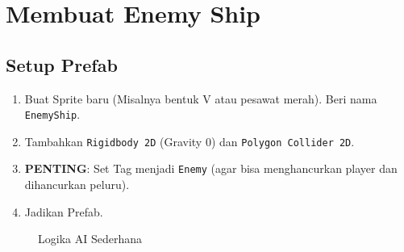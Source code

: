 
\section{Membuat Enemy Ship}

\subsection{Setup Prefab}
\begin{enumerate}
    \item Buat Sprite baru (Misalnya bentuk V atau pesawat merah). Beri nama \texttt{EnemyShip}.
    \item Tambahkan \texttt{Rigidbody 2D} (Gravity 0) dan \texttt{Polygon Collider 2D}.
    \item \textbf{PENTING}: Set Tag menjadi \texttt{Enemy} (agar bisa menghancurkan player dan dihancurkan peluru).
    \item Jadikan Prefab.
\end{enumerate}

\begin{figure}[ht]
    \centering
    \caption{Logika AI Sederhana}
    \label{fig:enemy_ai}
\end{figure}
